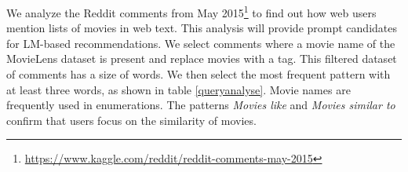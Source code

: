 \documentclass[runningheads]{llncs}
\begin{document}

 We analyze the Reddit comments from May 2015\footnote{\url{https://www.kaggle.com/reddit/reddit-comments-may-2015}} to find out how web users mention lists of movies in web text. This analysis will provide prompt candidates for LM-based recommendations.  We select comments where a movie name of the MovieLens dataset is present and replace movies with a  tag.  This filtered dataset of comments has a size of  words. We then select the most frequent pattern with at least three words, as shown in table \ref{queryanalyse}. Movie names are frequently used in enumerations. The patterns \textit{Movies like } and \textit{Movies similar to } confirm that users focus on the similarity of movies.
\end{document}

